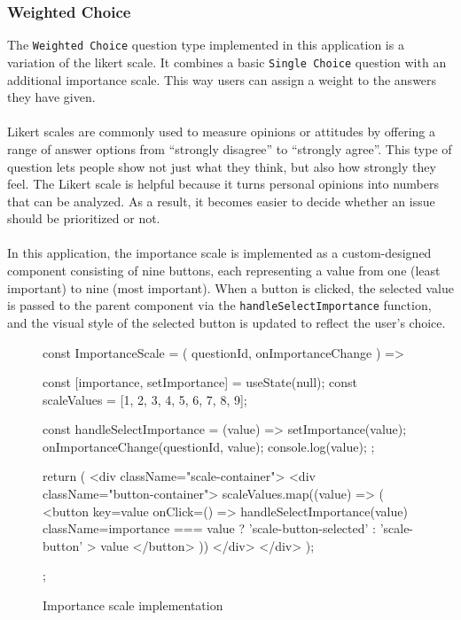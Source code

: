 \documentclass[a4paper,12pt]{report}
\begin{document}
\subsubsection{Weighted Choice}
The \texttt{Weighted Choice} question type implemented in this application is a variation of the likert scale. It combines a basic \texttt{Single Choice} question with an additional importance scale. This way users can assign a weight to the answers they have given. \\\\
Likert scales are commonly used to measure opinions or attitudes by offering a range of answer options from “strongly disagree” to “strongly agree”. This type of question lets people show not just what they think, but also how strongly they feel. The Likert scale is helpful because it turns personal opinions into numbers that can be analyzed. As a result, it becomes easier to decide whether an issue should be prioritized or not. \parencite{likert-scale} \\\\
In this application, the importance scale is implemented as a custom-designed component consisting of nine buttons, each representing a value from one (least important) to nine (most important). When a button is clicked, the selected value is passed to the parent component via the \texttt{handleSelectImportance} function, and the visual style of the selected button is updated to reflect the user’s choice.
\begin{figure}[H]
	\begin{jsx}
	const ImportanceScale = ({ questionId, onImportanceChange }) => {
		const [importance, setImportance] = useState(null);
		const scaleValues = [1, 2, 3, 4, 5, 6, 7, 8, 9];
			
		const handleSelectImportance = (value) => {
			setImportance(value);
			onImportanceChange(questionId, value);
			console.log(value);
		};
			
		return (
		<div className="scale-container">
			<div className="button-container">
				{scaleValues.map((value) => (
					<button
					key={value}
					onClick={() => handleSelectImportance(value)}
					className={importance === value ? 'scale-button-selected' : 'scale-button'}
					>
					{value}
					</button>
				))}
			</div>
		</div>
		);
	};
	\end{jsx}
	\caption{Importance scale implementation}
	\label{fig:importance-scale}
\end{figure} 
\end{document}

